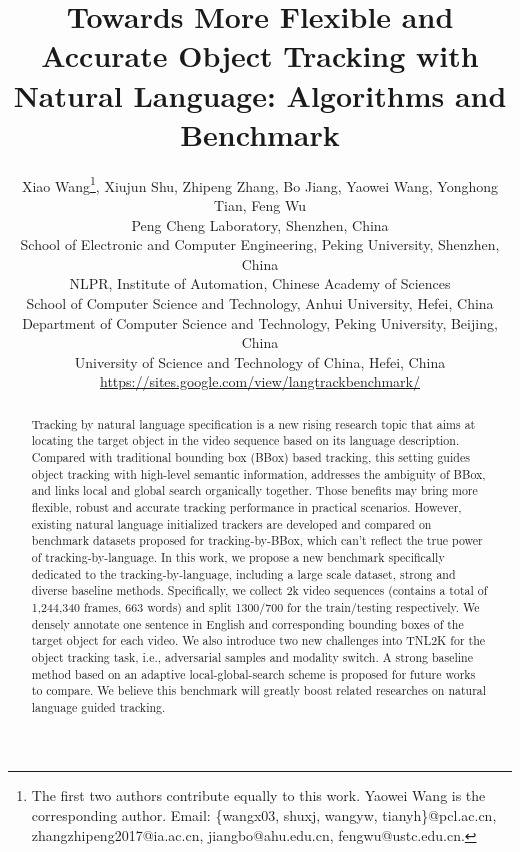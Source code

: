 \documentclass[final]{cvpr}
\begin{document}
\title{Towards More Flexible and Accurate Object Tracking with Natural Language: Algorithms and Benchmark	}
\author{
Xiao Wang\thanks{The first two authors contribute equally to this work. Yaowei Wang is the corresponding author. Email: \{wangx03, shuxj, wangyw, tianyh\}@pcl.ac.cn, zhangzhipeng2017@ia.ac.cn, jiangbo@ahu.edu.cn, fengwu@ustc.edu.cn.}, Xiujun Shu, Zhipeng Zhang, Bo Jiang, Yaowei Wang, Yonghong Tian, Feng Wu \\ 
Peng Cheng Laboratory, Shenzhen, China \\
School of Electronic and Computer Engineering, Peking University, Shenzhen, China  \\
NLPR, Institute of Automation, Chinese Academy of Sciences \\
School of Computer Science and Technology, Anhui University, Hefei, China \\
Department of Computer Science and Technology, Peking University, Beijing, China  \\
University of Science and Technology of China, Hefei, China \\
\url{https://sites.google.com/view/langtrackbenchmark/}
}




\maketitle


\begin{abstract}
Tracking by natural language specification is a new rising research topic that aims at locating the target object in the video sequence based on its language description. Compared with traditional bounding box (BBox) based tracking, this setting guides object tracking with high-level semantic information, addresses the ambiguity of BBox, and links local and global search organically together. Those benefits may bring more flexible, robust and accurate tracking performance in practical scenarios. However, existing natural language initialized trackers are developed and compared on benchmark datasets proposed for tracking-by-BBox, which can't reflect the true power of tracking-by-language. In this work, we propose a new benchmark specifically dedicated to the tracking-by-language, including a large scale dataset, strong and diverse baseline methods. Specifically, we collect 2k video sequences (contains a total of 1,244,340 frames, 663 words) and split 1300/700 for the train/testing respectively. We densely annotate one sentence in English and corresponding bounding boxes of the target object for each video. We also introduce two new challenges into TNL2K for the object tracking task, i.e., adversarial samples and modality switch. A strong baseline method based on an adaptive local-global-search scheme is proposed for future works to compare. We believe this benchmark will greatly boost related researches on natural language guided tracking. 
\end{abstract}
\end{document}
